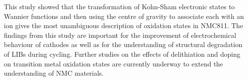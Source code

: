 \documentclass[journal=jacsat,manuscript=article]{achemso}
\begin{document}



This study  showed that the transformation of Kohn-Sham electronic states to Wannier functions and then using the centre of gravity to associate each with an ion gives the most unambiguous description of oxidation states in NMC811. The findings from this study are important for the improvement of electrochemical behaviour of cathodes as well as for the understanding of structural degradation of LIBs during cycling. Further studies on the effects of delithiation and doping on transition metal oxidation states are currently underway to extend the understanding of NMC materials.
\end{document}
